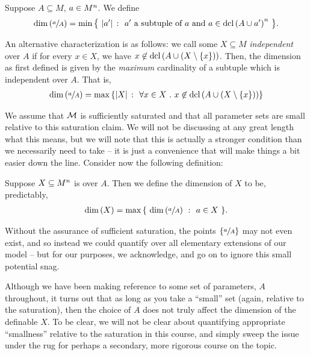Suppose $A \subseteq M$, $\aMn[a]{n}$. We define
  \begin{align*}
    \dim{\sfrac{a}{A}} = \min{ \left\{ \ \card{\pri{a}} \ \colon \ \pri{a} \textrm{ a subtuple of } a \textrm{ and } a \in \dcl{A \cup \pri{a}}^n \ \right\} }.
  \end{align*}

An alternative characterization is as follows: we call some $X \subseteq M$ \emph{independent} over $A$ if for every $x \in X$, we have $x \not\in \dcl{A \cup (X \setminus \{ x \})}$. Then, the dimension as first defined is given by the \emph{maximum} cardinality of a subtuple which is independent over $A$. That is,
  \begin{align*}
    \dim{ \sfrac{a}{A} } = \max{ \left\{ \card{X} \ \colon \ \forall x \in X \ . \ x \not\in \dcl{A \cup (X \setminus \{ x \})} \right\} }
  \end{align*}

We assume that $\M$ is sufficiently saturated and that all parameter sets are small relative to this saturation claim. We will not be discussing at any great length what this means, but we will note that this is actually a stronger condition than we necessarily need to take -- it is just a convenience that will make things a bit easier down the line. Consider now the following definition:

\begin{definition}
  Suppose $\XMn[X]{n}$ is  over $A$. Then we define the dimension of $X$ to be, predictably,
    \begin{align*}
      \dim{X} = \max{ \left\{ \ \dim{\sfrac{a}{A}} \ \colon \ a \in X \ \right\} }.
    \end{align*}
    \label{defn:alg_dim}
\end{definition}

\begin{remark}
  Without the assurance of sufficient saturation, the points $\left\{ \sfrac{a}{A} \right\}$ may not even exist, and so instead we could quantify over all elementary extensions of our model -- but for our purposes, we acknowledge, and go on to ignore this small potential snag.
\end{remark}

Although we have been making reference to some set of parameters, $A$ throughout, it turns out that as long as you take a ``small'' set (again, relative to the saturation), then the choice of $A$ does not truly affect the dimension of the definable $X$. To be clear, we will not be clear about quantifying appropriate ``smallness'' relative to the saturation in this course, and simply sweep the issue under the rug for perhaps a secondary, more rigorous course on the topic.

